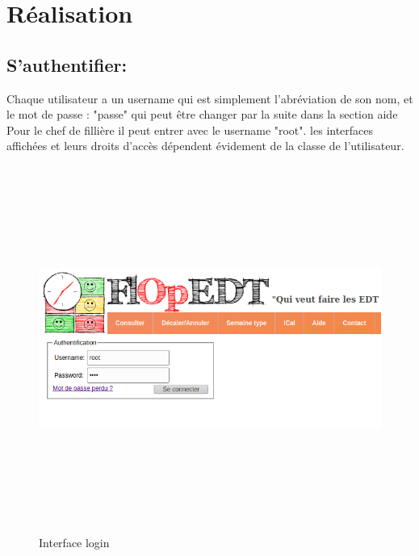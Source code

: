 \newpage
\section{Réalisation}
\subsection*{S'authentifier:}
Chaque utilisateur a un username qui est simplement l'abréviation de son nom, et le mot de passe : "passe" qui peut être changer par la suite dans la section aide \\
 Pour le chef de fillière il peut entrer avec le username "root". les interfaces affichées et leurs  droits d'accès dépendent évidement de la classe de l'utilisateur. 
\begin{figure}[H]
      \centering
        \includegraphics[width=14cm,height=12cm]{img/1.png}
        \caption{Interface login}
\end{figure}
\newpage
